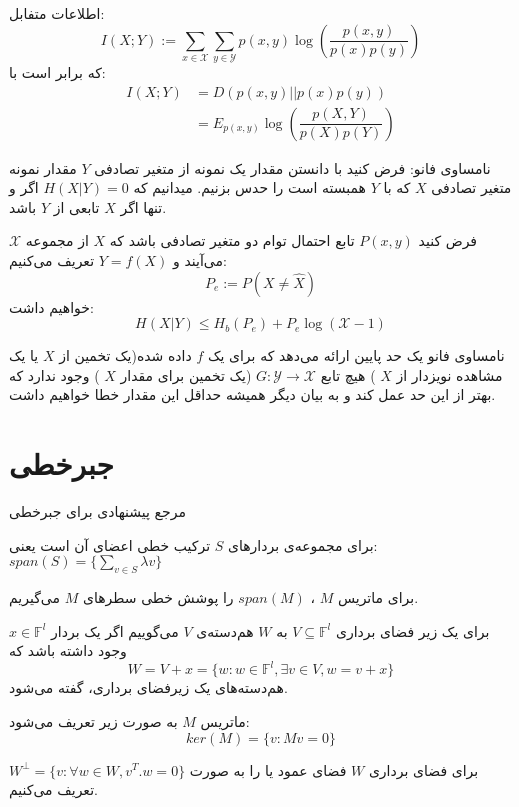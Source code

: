 \begin{definition}
اطلاعات متفابل:
$$I(X; Y) := \sum_{x \in \mathcal{X}} \sum_{y \in \mathcal{Y}} p(x, y) \log(\dfrac{p(x, y)}{p(x)p(y)})$$
که برابر است با:
\begin{align*}
    I(X;Y) &= D(p(x, y) || p(x)p(y))
    \\
    &= E_{p(x, y)} \log(\dfrac{p(X, Y)}{p(X)p(Y)})
\end{align*}
\end{definition}
نامساوی فانو: فرض کنید با دانستن مقدار یک نمونه از متغیر تصادفی
$Y$
مقدار نمونه متغیر تصادفی
$X$
که با
$Y$
همبسته است را حدس بزنیم. میدانیم که
$H(X|Y) = 0$
اگر و تنها اگر
$X$
تابعی از
$Y$
باشد. 
\begin{theorem}[
	فانو
	]
فرض کنید
$P(x, y)$
تابع احتمال توام دو متغیر تصادفی باشد که
$X$
از مجموعه
$\mathcal{X}$
می‌آیند و
$Y = f(X)$
تعریف می‌کنیم:
$$P_e := P(X \neq \hat{X})$$
خواهیم داشت:
$$H(X|Y) \leq H_b(P_e) + P_e \log(\mathcal{X} - 1)$$
\end{theorem}
\begin{remark}
نامساوی فانو یک حد پایین ارائه می‌دهد که برای یک
$f$
داده شده(یک تخمین از
$X$
یا یک مشاهده نویزدار از
$X$
) هیچ تابع
$G:\mathcal{Y} \rightarrow \mathcal{X}$
(یک تخمین برای مقدار
$X$
) وجود ندارد که بهتر از این حد عمل کند و به بیان دیگر همیشه حداقل این مقدار خطا خواهیم داشت.
\end{remark}
\section{جبرخطی}
مرجع پیشنهادی برای جبرخطی
\cite{sheldon}

\begin{definition}
	برای مجموعه‌ی بردار‌های
	$S$
	ترکیب خطی اعضای آن است یعنی:
	$span(S) = \{ \sum\limits_{v \in S} \lambda v\}$
	
	برای ماتریس
	$M$
	،
	$span(M)$
را پوشش خطی سطرهای 
$M$
می‌گیریم.
\end{definition}

\begin{definition}[
	همدسته
	]
	\label{coset}
	برای یک زیر فضای برداری
	$V \subseteq \mathbb{F}^l$
	به
	$W$
	هم‌دسته‌‌‌ی
	$V$
	می‌گوییم اگر یک بردار
	$x \in \mathbb{F}^l$
	وجود داشته باشد که
	$$W = V + x = \{w: w \in \mathbb{F}^l, \exists v \in V, w = v + x\}$$
	هم‌دسته‌های یک زیرفضای برداری،
	گفته می‌شود.
\end{definition}
\begin{definition}[
	هسته
	]
	ماتریس
	$M$
	به صورت زیر تعریف می‌شود:
	$$ker(M) = \{v: Mv = 0\}$$
\end{definition}
برای فضای برداری
$W$
فضای عمود یا
 را به صورت
$W^\bot = \{v: \forall w \in W, v^T.w = 0\}$
تعریف می‌کنیم.

